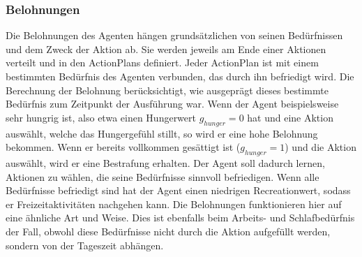 \subsubsection{Belohnungen}\label{agents_rewards}
Die Belohnungen des Agenten hängen grundsätzlichen von seinen Bedürfnissen und dem Zweck der Aktion ab. Sie werden jeweils am Ende einer Aktionen verteilt und in den ActionPlans definiert. Jeder ActionPlan ist mit einem bestimmten Bedürfnis des Agenten verbunden, das durch ihn befriedigt wird. Die Berechnung der Belohnung berücksichtigt, wie ausgeprägt dieses bestimmte Bedürfnis zum Zeitpunkt der Ausführung war. Wenn der Agent beispielsweise sehr hungrig ist, also etwa einen Hungerwert $g_{hunger} = 0$ hat und eine Aktion  auswählt, welche das Hungergefühl stillt, so wird er eine hohe Belohnung bekommen. Wenn er bereits vollkommen gesättigt ist ($g_{hunger} = 1$) und die Aktion  auswählt, wird er eine Bestrafung erhalten. Der Agent soll dadurch lernen, Aktionen zu wählen, die seine Bedürfnisse sinnvoll befriedigen. Wenn alle Bedürfnisse befriedigt sind hat der Agent einen niedrigen Recreationwert, sodass er Freizeitaktivitäten nachgehen kann. Die Belohnungen funktionieren hier auf eine ähnliche Art und Weise. Dies ist ebenfalls beim Arbeits- und Schlafbedürfnis der Fall, obwohl diese Bedürfnisse nicht durch die Aktion aufgefüllt werden, sondern von der Tageszeit abhängen.


